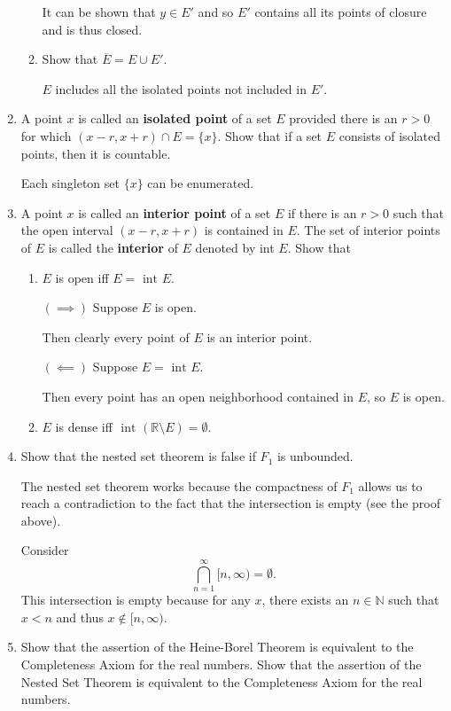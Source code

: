 \documentclass[a4paper,10pt]{book}
\theoremstyle{plain} %
\begin{document}
\begin{enumerate}
\begin{enumerate}[label=(\roman*),align=left]
		It can be shown that $y \in E'$ and so $E'$ contains all its points of closure and is thus closed.
        \item Show that $\overline E = E \cup E'.$\par
        $E$ includes all the isolated points not included in $E'$. 
    \end{enumerate}
	\item A point $x$ is called an \textbf{ isolated point} of a set $E$ provided there is an $r>0$ for which $(x-r,x+r)\cap E = \{x\}.$ Show that if a set $E$ consists of isolated points, then it is countable.\par
	Each singleton set $\{x\}$ can be enumerated.
	\item A point $x$ is called an \textbf{interior point} of a set $E$ if there is an $r>0$ such that the open interval $(x-r,x+r)$ is contained in $E$. The set of interior points of $E$ is called the \textbf{interior} of $E$ denoted by int $E$. Show that
	\begin{enumerate}[label=(\roman*),align=left]
        \item $E$ is open iff $E = \text{ int } E$.\par
        $(\implies)$ Suppose $E$ is open.\par
		Then clearly every point of $E$ is an interior point.
		\par
		$(\impliedby)$ Suppose $E = \text{ int } E$.\par
		Then every point has an open neighborhood contained in $E$, so $E$ is open.
        \item $E$ is dense iff $ \text{ int } (\mathbb{R} \setminus E)= \emptyset$.
    \end{enumerate}
	\item Show that the nested set theorem is false if $F_1$ is unbounded.\par
	The nested set theorem works because the compactness of $F_1$ allows us to reach a contradiction to the fact that the intersection is empty (see the proof above).\par
	Consider
	\[
	\bigcap_{n=1}^\infty [n, \infty) = \emptyset.
	\]
	This intersection is empty because for any $x$, there exists an $n \in \mathbb{N}$ such that $x < n$ and thus $x \notin [n,\infty)$.
	\item Show that the assertion of the Heine-Borel Theorem is equivalent to the Completeness Axiom for the real numbers. Show that the assertion of the Nested Set Theorem is equivalent to the Completeness Axiom for the real numbers.\par

\end{enumerate}
\end{document}

